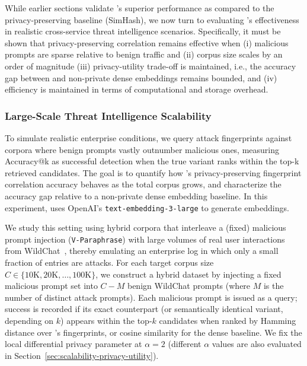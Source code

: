 While earlier sections validate \tool's superior performance as compared to the privacy-preserving baseline (SimHash), we now turn to evaluating \tool's effectiveness in realistic cross-service threat intelligence scenarios.
Specifically, it must be shown that privacy-preserving correlation remains effective when (i) malicious prompts are sparse relative to benign traffic and (ii) corpus size scales by an order of magnitude  (iii) privacy-utility trade-off is maintained, i.e., the accuracy gap between \tool and non-private dense embeddings remains bounded, and (iv) efficiency is maintained in terms of computational and storage overhead.





\subsubsection{Large-Scale Threat Intelligence Scalability}
\label{sec:large-scale-threat-intelligence-scalability}
To simulate realistic enterprise conditions, we query attack fingerprints against corpora where benign prompts vastly outnumber malicious ones, measuring Accuracy@k as successful detection when the true variant ranks within the top-k retrieved candidates. The goal is to quantify how \tool's privacy-preserving fingerprint correlation accuracy behaves as the total corpus grows, and characterize the accuracy gap relative to a non-private dense embedding baseline. In this experiment, \tool uses OpenAI's  \texttt{text-embedding-3-large} to generate embeddings. 

We study this setting using hybrid corpora that interleave a (fixed) malicious prompt injection (\texttt{V-Paraphrase}) with large volumes of real user interactions from WildChat~\cite{zhao2024wildchat}, thereby emulating an enterprise log in which only a small fraction of entries are attacks. For each target corpus size $C \in \{10\text{K},20\text{K},\dots,100\text{K}\}$, we construct a hybrid dataset by injecting a fixed malicious prompt set into $C - M$ benign WildChat prompts (where $M$ is the number of distinct attack prompts).
Each malicious prompt is issued as a query; success is recorded if its exact counterpart (or semantically identical variant, depending on $k$) appears within the top-$k$ candidates when ranked by Hamming distance over \tool's fingerprints, or cosine similarity for the dense baseline. We fix the local differential privacy parameter at $\alpha = 2$ (different $\alpha$ values are also evaluated in Section~\ref{sec:scalability-privacy-utility}).

